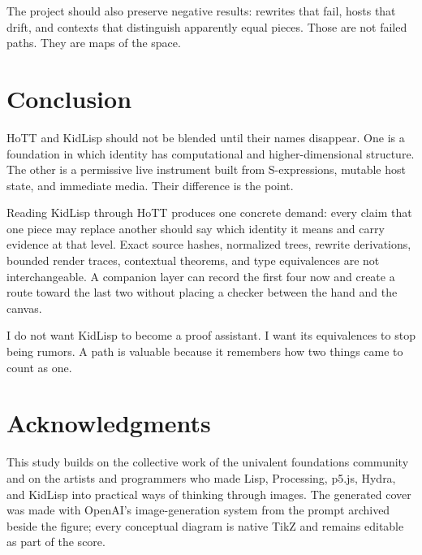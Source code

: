 \documentclass[10pt,letterpaper,twocolumn]{article}
\begin{document}
The project should also preserve negative results: rewrites that fail, hosts that drift, and contexts that distinguish apparently equal pieces. Those are not failed paths. They are maps of the space.

\section{Conclusion}
\label{sec:conclusion}

HoTT and KidLisp should not be blended until their names disappear. One is a foundation in which identity has computational and higher-dimensional structure. The other is a permissive live instrument built from S-expressions, mutable host state, and immediate media. Their difference is the point.

Reading KidLisp through HoTT produces one concrete demand: every claim that one piece may replace another should say which identity it means and carry evidence at that level. Exact source hashes, normalized trees, rewrite derivations, bounded render traces, contextual theorems, and type equivalences are not interchangeable. A companion layer can record the first four now and create a route toward the last two without placing a checker between the hand and the canvas.

I do not want KidLisp to become a proof assistant. I want its equivalences to stop being rumors. A path is valuable because it remembers how two things came to count as one.

\section*{Acknowledgments}

This study builds on the collective work of the univalent foundations community and on the artists and programmers who made Lisp, Processing, p5.js, Hydra, and KidLisp into practical ways of thinking through images. The generated cover was made with OpenAI's image-generation system from the prompt archived beside the figure; every conceptual diagram is native TikZ and remains editable as part of the score.




\vfill
\begin{center}
\footnotesize\color{acgray}
\\[0.35em]
\paperhistory
\end{center}
\end{document}
